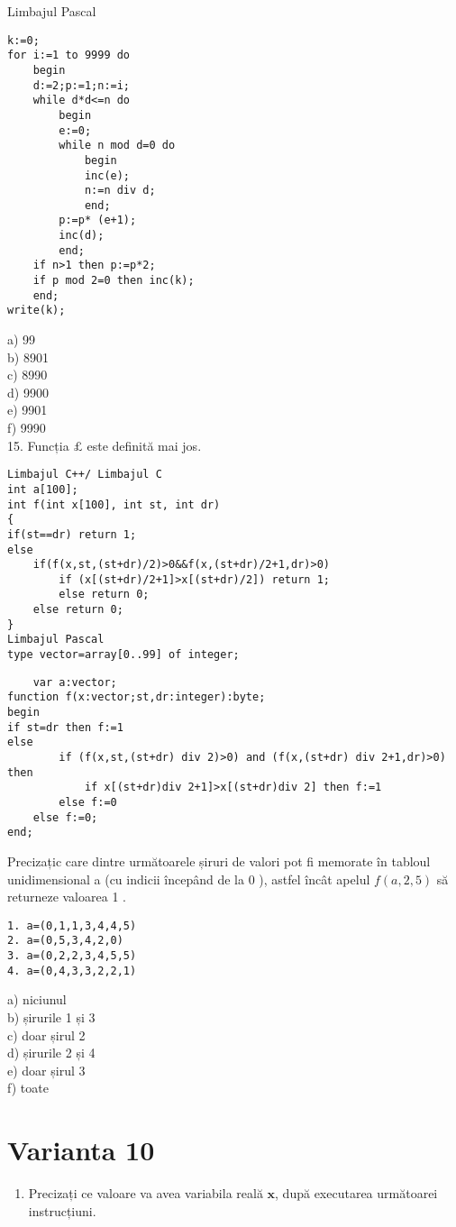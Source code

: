 Limbajul Pascal

\begin{verbatim}
k:=0;
for i:=1 to 9999 do
    begin
    d:=2;p:=1;n:=i;
    while d*d<=n do
        begin
        e:=0;
        while n mod d=0 do
            begin
            inc(e);
            n:=n div d;
            end;
        p:=p* (e+1);
        inc(d);
        end;
    if n>1 then p:=p*2;
    if p mod 2=0 then inc(k);
    end;
write(k);
\end{verbatim}

a) 99\\
b) 8901\\
c) 8990\\
d) 9900\\
e) 9901\\
f) 9990\\
15. Funcția $\pounds$ este definită mai jos.

\begin{verbatim}
Limbajul C++/ Limbajul C
int a[100];
int f(int x[100], int st, int dr)
{
if(st==dr) return 1;
else
    if(f(x,st,(st+dr)/2)>0&&f(x,(st+dr)/2+1,dr)>0)
        if (x[(st+dr)/2+1]>x[(st+dr)/2]) return 1;
        else return 0;
    else return 0;
}
Limbajul Pascal
type vector=array[0..99] of integer;
\end{verbatim}

\begin{verbatim}
    var a:vector;
function f(x:vector;st,dr:integer):byte;
begin
if st=dr then f:=1
else
        if (f(x,st,(st+dr) div 2)>0) and (f(x,(st+dr) div 2+1,dr)>0) then
            if x[(st+dr)div 2+1]>x[(st+dr)div 2] then f:=1
        else f:=0
    else f:=0;
end;
\end{verbatim}

Precizațic care dintre următoarele șiruri de valori pot fi memorate în tabloul unidimensional a (cu indicii începând de la 0 ), astfel încât apelul $f(a, 2,5)$ să returneze valoarea 1 .

\begin{verbatim}
1. a=(0,1,1,3,4,4,5)
2. a=(0,5,3,4,2,0)
3. a=(0,2,2,3,4,5,5)
4. a=(0,4,3,3,2,2,1)
\end{verbatim}

a) niciunul\\
b) șirurile 1 și 3\\
c) doar șirul 2\\
d) șirurile 2 și 4\\
e) doar șirul 3\\
f) toate

\section*{Varianta 10}
\begin{enumerate}
  \item Precizați ce valoare va avea variabila reală $\mathbf{x}$, după executarea următoarei instrucțiuni.
\end{enumerate}

